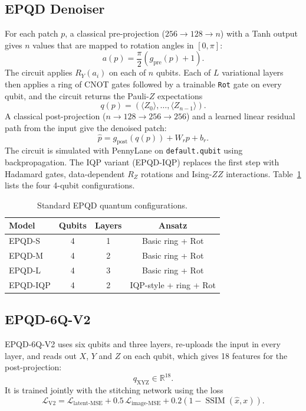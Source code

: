 \subsection{EPQD Denoiser}
For each patch $p$, a classical pre-projection ($256\rightarrow128\rightarrow n$) with a Tanh output gives $n$ values that are mapped to rotation angles in $[0,\pi]$:
\begin{equation}
    a(p)=\frac{\pi}{2}\left(g_{\mathrm{pre}}(p)+1\right).
\end{equation}
The circuit applies $R_Y(a_i)$ on each of $n$ qubits. Each of $L$ variational layers then applies a ring of CNOT gates followed by a trainable \texttt{Rot} gate on every qubit, and the circuit returns the Pauli-$Z$ expectations
\begin{equation}
    q(p)=\left(\langle Z_0\rangle,\ldots,\langle Z_{n-1}\rangle\right).
\end{equation}
A classical post-projection ($n\rightarrow128\rightarrow256\rightarrow256$) and a learned linear residual path from the input give the denoised patch:
\begin{equation}
    \hat p=g_{\mathrm{post}}(q(p))+W_rp+b_r.
\end{equation}
The circuit is simulated with PennyLane on \texttt{default.qubit} using backpropagation. The IQP variant (EPQD-IQP) replaces the first step with Hadamard gates, data-dependent $R_Z$ rotations and Ising-$ZZ$ interactions. Table~\ref{tab:configs} lists the four 4-qubit configurations.

\begin{table}[t]
\centering
\caption{Standard EPQD quantum configurations.}
\label{tab:configs}
\begin{tabular}{lccc}
\toprule
\textbf{Model} & \textbf{Qubits} & \textbf{Layers} & \textbf{Ansatz}\\
\midrule
EPQD-S & 4 & 1 & Basic ring + Rot\\
EPQD-M & 4 & 2 & Basic ring + Rot\\
EPQD-L & 4 & 3 & Basic ring + Rot\\
EPQD-IQP & 4 & 2 & IQP-style + ring + Rot\\
\bottomrule
\end{tabular}
\end{table}

\subsection{EPQD-6Q-V2}
EPQD-6Q-V2 uses six qubits and three layers, re-uploads the input in every layer, and reads out $X$, $Y$ and $Z$ on each qubit, which gives 18 features for the post-projection:
\begin{equation}
    q_{\mathrm{XYZ}}\in\mathbb{R}^{18}.
\end{equation}
It is trained jointly with the stitching network using the loss
\begin{equation}
    \mathcal{L}_{\mathrm{V2}}=
    \mathcal{L}_{\mathrm{latent\text{-}MSE}}
    +0.5\,\mathcal{L}_{\mathrm{image\text{-}MSE}}
    +0.2\left(1-\operatorname{SSIM}(\hat x,x)\right).
\end{equation}

